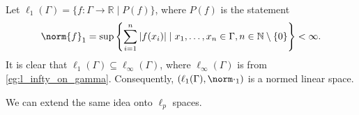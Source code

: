 \documentclass[notoc,notitlepage]{tufte-book}
\begin{document}
\begin{eg}
  Let $\ell_1(\Gamma) = \{ f : \Gamma \to \mathbb{R} \mid P(f) \}$, where $P(f)$ is the statement
  \begin{equation*}
    \norm{f}_1 = \sup \left\{ \sum_{i=1}^{n} \abs{f(x_i)} \mid x_1, \ldots, x_n \in \Gamma, n \in \mathbb{N} \setminus \{ 0 \} \right\} < \infty.
  \end{equation*}
  It is clear that $\ell_1(\Gamma) \subseteq \ell_\infty(\Gamma)$, where $\ell_\infty(\Gamma)$ is from \cref{eg:l_infty_on_gamma}. Consequently, $(\ell_1(\Gamma), \norm\cdot_1)$ is a normed linear space.
\end{eg}

We can extend the same idea onto $\ell_p$ spaces.
\end{document}
